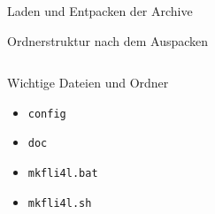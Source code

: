 \documentclass[t]{beamer}
\begin{document}
\begin{frame}{Laden und Entpacken der Archive}
    \begin{figure}
    \end{figure}
\end{frame}

\begin{frame}{Ordnerstruktur nach dem Auspacken}
    \begin{figure}
    \end{figure}

    \begin{columns}[T,onlytextwidth]
        \begin{column}{0.5\textwidth}
            \begin{block}{Wichtige Dateien und Ordner}
                \begin{itemize}
                    \item \texttt{config}
                    \item \texttt{doc}
                    \item \texttt{mkfli4l.bat}
                    \item \texttt{mkfli4l.sh}
                \end{itemize}
            \end{block}
        \end{column}
        \begin{column}{0.5\textwidth}
            \begin{figure}
            \end{figure}
        \end{column}
    \end{columns}
\end{frame}
\end{document}

